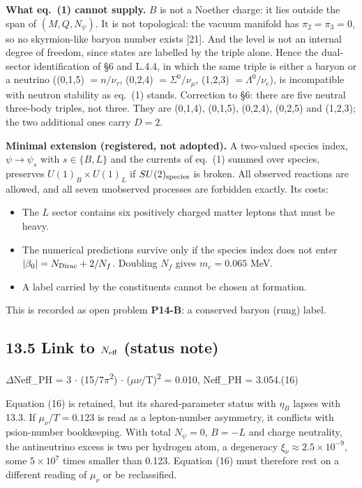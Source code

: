 \noindent \textbf{What eq.~(1) cannot supply. }$B$ is not a Noether charge: it lies outside the span of $(M,Q,N_\psi)$. It is not topological: the vacuum manifold has $\pi_2=\pi_3=0$, so no skyrmion-like baryon number exists [21]. And the level is not an internal degree of freedom, since states are labelled by the triple alone. Hence the dual-sector identification of \S6 and L.4.4, in which the same triple is either a baryon or a neutrino ((0,1,5) $=n/\nu_\tau$, (0,2,4) $=\Sigma^0/\nu_\mu$, (1,2,3) $=\Lambda^0/\nu_e$), is incompatible with neutron stability as eq.~(1) stands. Correction to \S6: there are five neutral three-body triples, not three. They are (0,1,4), (0,1,5), (0,2,4), (0,2,5) and (1,2,3); the two additional ones carry $D=2$.

\noindent \textbf{Minimal extension (registered, not adopted). }A two-valued species index, $\psi\to\psi_s$ with $s\in\{B,L\}$ and the currents of eq.~(1) summed over species, preserves $U(1)_B\times U(1)_L$ if $SU(2)_{\rm species}$ is broken. All observed reactions are allowed, and all seven unobserved processes are forbidden exactly. Its costs:
\begin{itemize}
\item The $L$ sector contains six positively charged matter leptons that must be heavy.
\item The numerical predictions survive only if the species index does not enter $|\beta_0|=N_{\rm Dirac}+2/N_f$. Doubling $N_f$ gives $m_e=0.065$ MeV.
\item A label carried by the constituents cannot be chosen at formation.
\end{itemize}
This is recorded as open problem \textbf{P14-B}: a conserved baryon (rung) label.

\subsection*{13.5  Link to $N_{\rm eff}$ (status note)}

\begingroup\centering $\Delta$Neff\_PH = 3 $\cdot$ (15/7$\pi$\textsuperscript{2}) $\cdot$ ($\mu$$\nu$/T)\textsuperscript{2} = 0.010,   Neff\_PH = 3.054.\hspace{2em}(16)\par\endgroup

\noindent Equation (16) is retained, but its shared-parameter status with $\eta_B$ lapses with 13.3. If $\mu_\nu/T=0.123$ is read as a lepton-number asymmetry, it conflicts with psion-number bookkeeping. With total $N_\psi=0$, $B=-L$ and charge neutrality, the antineutrino excess is two per hydrogen atom, a degeneracy $\xi_\nu\approx2.5\times10^{-9}$, some $5\times10^7$ times smaller than 0.123. Equation (16) must therefore rest on a different reading of $\mu_\nu$ or be reclassified.

